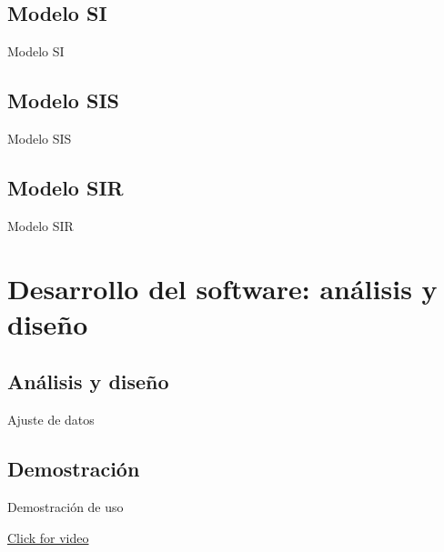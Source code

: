 \subsection{Modelo SI}


\begin{frame}{Modelo SI}

\end{frame}


\subsection{Modelo SIS}


\begin{frame}{Modelo SIS}

\end{frame}


\subsection{Modelo SIR}


\begin{frame}{Modelo SIR}

\end{frame}




\section{Desarrollo del software: análisis y diseño}


\subsection{Análisis y diseño}


\begin{frame}{}

\end{frame}


\begin{frame}{Ajuste de datos}

\end{frame}


\subsection{Demostración}


\begin{frame}{Demostración de uso}

    \href{run:/home/mapachana/2022-06-23 19-38-25.mkv}{Click for video}

\end{frame}


